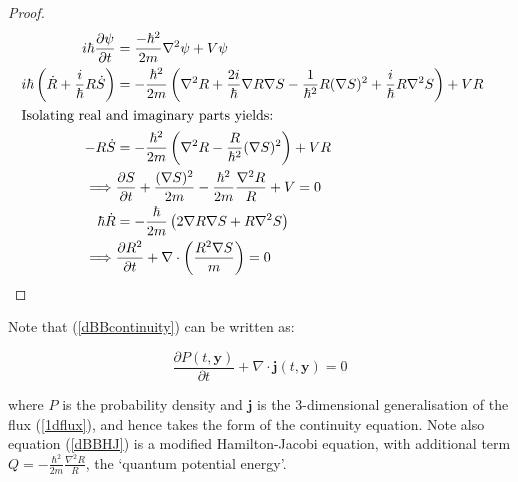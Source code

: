 \documentclass{article}
\begin{document}
\begin{proof}
\begin{subequations}
\begin{align}
i\hbar \frac{\partial\psi}{\partial t} &= \frac{-\hbar^2}{2m}\nabla^2\psi+V\psi\\
i\hbar\left(\dot{R}+\frac{i}{\hbar}R\dot{S}\right) &= -\frac{\hbar^2}{2m}\left(\nabla^2R+\frac{2i}{\hbar}\nabla R \nabla S-\frac{1}{\hbar^2}R(\nabla S)^2+\frac{i}{\hbar}R\nabla^2 S\right)+VR\\\intertext{Isolating real and imaginary parts yields:}
-R\dot{S}&=-\frac{\hbar^2}{2m}\left(\nabla^2 R-\frac{R}{\hbar^2}(\nabla S)^2\right)+VR&\\
\implies &\frac{\partial S}{\partial t}+\frac{(\nabla S)^2}{2m}-\frac{\hbar^2}{2m}\frac{\nabla^2 R}{R}+V=0\\
\hbar\dot{R} &= -\frac{\hbar}{2m}\left(2\nabla R\nabla S+R\nabla^2S\right)\\
\implies &\frac{\partial R^2}{\partial t}+\nabla\cdot\left(\frac{R^2\nabla S}{m}\right)=0
\end{align}
\end{subequations}
\end{proof}

\noindent Note that (\ref{dBBcontinuity}) can be written as:

\begin{equation}
	\frac{\partial P(t,\boldsymbol{y})}{\partial t}+\nabla \cdot \boldsymbol{j}(t,\boldsymbol{y})=0
\end{equation}

\noindent where $P$ is the probability density and $\boldsymbol{j}$ is the 3-dimensional generalisation of the flux (\ref{1dflux}), and hence takes the form of the continuity equation. Note also equation (\ref{dBBHJ}) is a modified Hamilton-Jacobi equation, with additional term $Q=-\frac{\hbar^2}{2m}\frac{\nabla^2 R}{R}$, the `quantum potential energy'.
\end{document}
